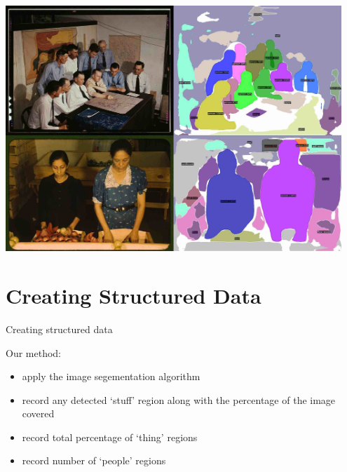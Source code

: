 \documentclass[12pt,ignorenonframetext,aspectratio=169]{beamer}
\begin{document}
\begin{frame}{}

\begin{center}
\includegraphics[width=0.95\textwidth]{../figures/segmentation_examples.jpg}
\end{center}

\end{frame}

\section{Creating Structured Data}

\begin{frame}{Creating structured data}

Our method:

\begin{itemize}
\item apply the image segementation algorithm
\item record any detected `stuff' region along with the percentage of the image covered
\item record total percentage of `thing' regions
\item record number of `people' regions
\end{itemize}

\end{frame}
\end{document}
